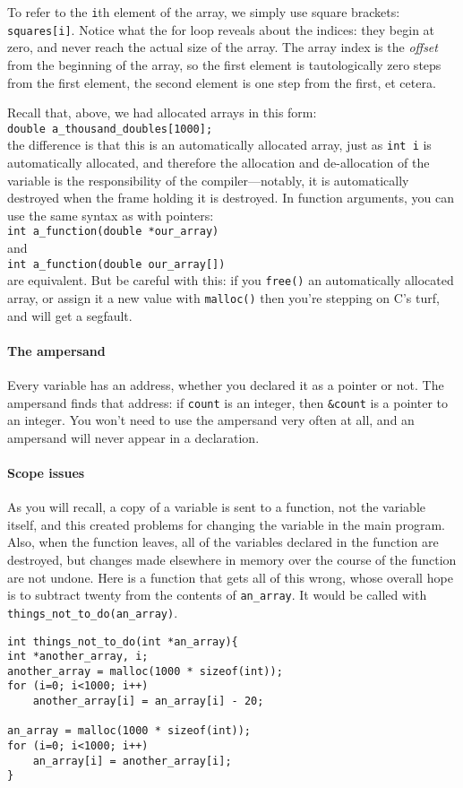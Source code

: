 \documentclass[12pt]{article}
\begin{document}
To refer to the {\tt i}th element of the array, we simply use square
brackets: {\tt squares[i]}. Notice what the for loop reveals about
the indices: they begin at zero, and never reach the actual size of
the array. The array index is the {\sl offset} from the beginning of
the array, so the first element is tautologically zero steps from the first element,
the second element is one step from the first, et cetera. 

Recall that, above, we had allocated arrays in this form:\\
{\tt double a\_thousand\_doubles[1000];}\\
the difference is that this is an automatically allocated array, just
as {\tt int i} is automatically allocated, and therefore
the allocation and de-allocation of the variable is the responsibility
of the compiler---notably, it is automatically destroyed when the frame
holding it is destroyed. In function arguments, you can use the same
syntax as with pointers: 
\\ {\tt int a\_function(double *our\_array)}\\
and
\\ {\tt int a\_function(double our\_array[])}\\
are equivalent.
But be careful with this: if you {\tt free()} an automatically allocated
array, or assign it a new value with {\tt malloc()} then you're stepping
on C's turf, and will get a segfault.

\paragraph{The ampersand}\index{\&} Every variable has an address, whether you
declared it as a pointer or not. The ampersand finds that address: if
{\tt count} is an integer, then {\tt \&count} is a pointer to an integer.
You won't need to use the ampersand very often at all, and 
an ampersand will never appear in a declaration.

\paragraph{Scope issues} As you will recall, a copy of a variable is sent to a function, not the variable
itself, and this created problems for changing the variable in the main program. Also, when the function
leaves, all of the variables declared in the function are destroyed,
but changes made elsewhere in memory over the course of the function
are not undone. Here is a function that gets all of this wrong, whose overall hope is to subtract twenty
from the contents of {\tt an\_array}. It would be called with {\tt things\_not\_to\_do(an\_array)}.
\begin{verbatim}
int things_not_to_do(int *an_array){
int *another_array, i;
another_array = malloc(1000 * sizeof(int));
for (i=0; i<1000; i++)
    another_array[i] = an_array[i] - 20;

an_array = malloc(1000 * sizeof(int));
for (i=0; i<1000; i++)
    an_array[i] = another_array[i];
}
\end{verbatim}
\end{document}
